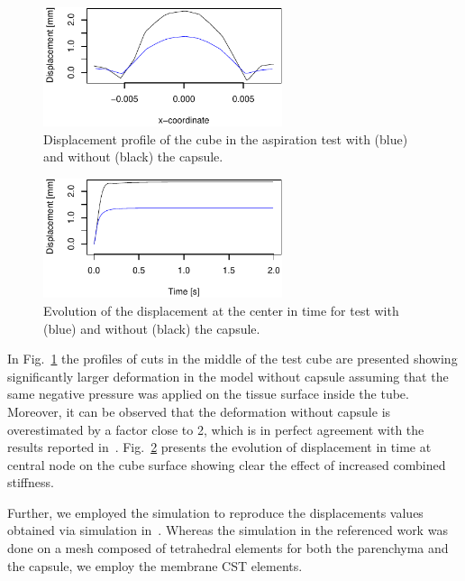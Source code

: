 \begin{figure}[t]
  \centering
  \includegraphics[width=7cm]{figures/displacementProfile.pdf}
  \caption{\label{fig-aspiration2} Displacement profile of the cube in the
  aspiration test with (blue) and without (black) the capsule.}
\end{figure}

\begin{figure}
  \centering
  \includegraphics[height=3.5cm]{figures/displacementEvolution.pdf}
  \caption{\label{fig-aspiration3} Evolution of the displacement at the center
  in time for test with (blue) and without (black) the capsule.}
\end{figure}

In Fig.~\ref{fig-aspiration2} the profiles of cuts in the middle of the
test cube are presented showing significantly larger deformation in the model without capsule assuming that the same negative pressure was applied 
on the tissue surface inside the tube. Moreover, it can be observed that the deformation without capsule is overestimated by a factor 
close to 2, which is in perfect agreement with the results reported in~\cite{Hollenstein2006}.
Fig.~\ref{fig-aspiration3} presents the evolution of displacement in time at central node on the cube surface showing clear the effect of increased combined stiffness.

Further, we employed the simulation to reproduce the displacements values obtained via simulation in~\cite{Hollenstein2006,Nava2008}.
Whereas the simulation in the referenced work was done on a mesh composed of tetrahedral elements for both the parenchyma 
and the capsule, we employ the membrane CST elements.

